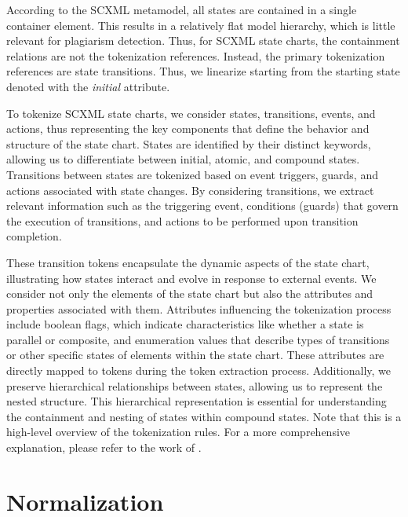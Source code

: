 According to the SCXML metamodel, all states are contained in a single container element. This results in a relatively flat model hierarchy, which is little relevant for plagiarism detection.
Thus, for SCXML state charts, the containment relations are not the tokenization references.
Instead, the primary tokenization references are state transitions. Thus, we linearize starting from the starting state denoted with the \textit{initial} attribute.

To tokenize SCXML state charts, we consider states, transitions, events, and actions, thus representing the key components that define the behavior and structure of the state chart.
States are identified by their distinct keywords, allowing us to differentiate between initial, atomic, and compound states.
Transitions between states are tokenized based on event triggers, guards, and actions associated with state changes. By considering transitions, we extract relevant information such as the triggering event, conditions (guards) that govern the execution of transitions, and actions to be performed upon transition completion.

These transition tokens encapsulate the dynamic aspects of the state chart, illustrating how states interact and evolve in response to external events.
We consider not only the elements of the state chart but also the attributes and properties associated with them. Attributes influencing the tokenization process include boolean flags, which indicate characteristics like whether a state is parallel or composite, and enumeration values that describe types of transitions or other specific states of elements within the state chart. These attributes are directly mapped to tokens during the token extraction process.
Additionally, we preserve hierarchical relationships between states, allowing us to represent the nested structure. This hierarchical representation is essential for understanding the containment and nesting of states within compound states.
Note that this is a high-level overview of the tokenization rules. For a more comprehensive explanation, please refer to the work of \citet{Strittmatter2023}.


\section{Normalization}\label{subsec:normalization}

